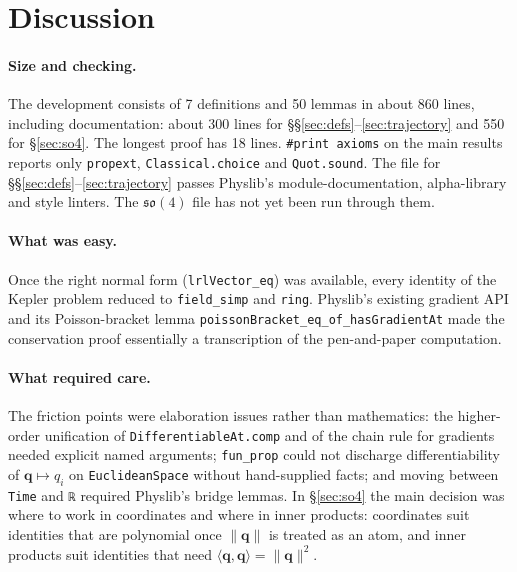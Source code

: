 \documentclass[11pt]{article}
\theoremstyle{definition}
\theoremstyle{remark}
\newcommand{\vq}{\mathbf{q}}
\newcommand{\ip}[2]{\langle #1, #2\rangle}
\begin{document}
\section{Discussion}

\paragraph{Size and checking.} The development consists of 7 definitions and 50 lemmas in about
860 lines, including documentation: about 300 lines for \S\S\ref{sec:defs}--\ref{sec:trajectory}
and 550 for \S\ref{sec:so4}. The longest proof has 18 lines. \texttt{\#print axioms} on the
main results reports only \texttt{propext}, \texttt{Classical.choice} and \texttt{Quot.sound}. The
file for \S\S\ref{sec:defs}--\ref{sec:trajectory} passes Physlib's module-documentation,
alpha-library and style linters. The $\mathfrak{so}(4)$ file has not yet been run through them.

\paragraph{What was easy.} Once the right normal form (\texttt{lrlVector\_eq}) was available, every
identity of the Kepler problem reduced to \texttt{field\_simp} and \texttt{ring}. Physlib's
existing gradient API and its Poisson-bracket lemma \texttt{poissonBracket\_eq\_of\_hasGradientAt}
made the conservation proof essentially a transcription of the pen-and-paper computation.

\paragraph{What required care.} The friction points were elaboration issues rather than
mathematics: the higher-order unification of \texttt{DifferentiableAt.comp} and of the chain rule
for gradients needed explicit named arguments; \texttt{fun\_prop} could not discharge
differentiability of $\vq\mapsto q_i$ on \texttt{EuclideanSpace} without hand-supplied facts; and
moving between \texttt{Time} and \texttt{ℝ} required Physlib's bridge lemmas. In
\S\ref{sec:so4} the main decision was where to work in coordinates and where in inner products:
coordinates suit identities that are polynomial once $\|\vq\|$ is treated as an atom, and inner
products suit identities that need $\ip{\vq}{\vq}=\|\vq\|^2$.
\end{document}
